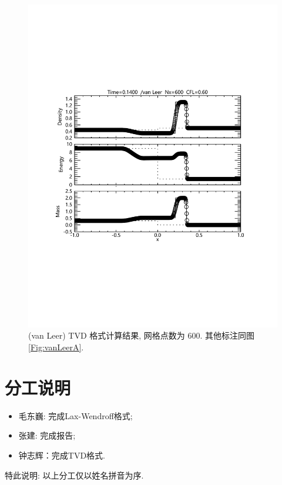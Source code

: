 \documentclass[10.5pt
]{article}
\begin{document}
\begin{figure}[htb]
\begin{center}
\includegraphics[width=.85\textwidth]{fig_tvd_2.pdf}
\caption{(van Leer) TVD 格式计算结果, 网格点数为 600. 其他标注同图\ref{Fig:vanLeerA}.}\label{Fig:vanLeerB}
\end{center}
\end{figure}
\clearpage
\section*{分工说明}

\begin{itemize}
	\item 毛东巍: 完成Lax-Wendroff格式;
	\item 张建: 完成报告;
	\item 钟志辉：完成TVD格式.
\end{itemize}
特此说明: 以上分工仅以姓名拼音为序.
\end{document}
